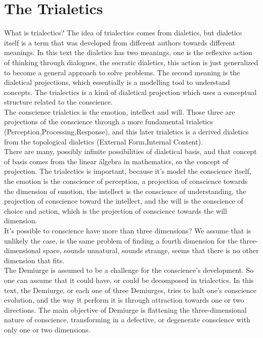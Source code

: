 \documentclass[12pt,a4paper]{article}
\begin{document}
\section{The Trialetics}

\hspace{\baselineskip}

What is trialectics? The idea of trialectics comes from dialetics, but dialetics itself is a term that was developed from different authors towards different meanings. In this text the dialetics has two meanings, one is the reflexive action of thinking through dialogues, the socratic dialetics, this action is just generalized to become a general approach to solve problems. The second meaning is the dialetical projections, which essentially is a modelling tool to understand concepts. The trialectics is a kind of dialetical projection which uses a conceptual structure related to the conscience. \\

The conscience trialetics is the emotion, intellect and will. Those three are projections of the conscience through a more fundamental trialetics (Perception,Processing,Response), and this later trialetics is a derived dialetics from the topological dialetics (External Form,Internal Content). \\

There are many, possibly infinite possibilities of dialetical basis, and that concept of basis comes from the linear álgebra in mathematics, so the concept of projection. The trialectics is important, because it's model the conscience itself, the emotion is the conscience of perception, a projection of conscience towards the dimension of emotion, the intellect is the conscience of understanding, the projection of conscience toward the intellect, and the will is the conscience of choice and action, which is the projection of conscience towards the will dimension. \\

It's possible to conscience have more than three dimensions? We assume that is unlikely the case, is the same problem of finding a fourth dimension for the three-dimensional space, sounds unnatural, sounds strange, seems that there is no other dimension that fits. \\

The Demiurge is assumed to be a challenge for the conscience's development. So one can assume that it could have, or could be decomposed in trialectics. In this text, the Demiurge, or each one of three Demiurges, tries to halt one's conscience evolution, and the way it perform it is through attraction towards one or two directions. The main objective of Demiurge is flattening the three-dimensional nature of conscience, transforming in a defective, or degenerate conscience with only one or two dimensions. 
\end{document}
